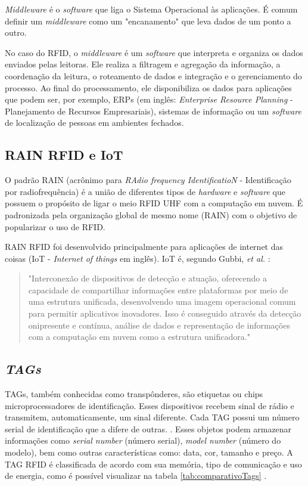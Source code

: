 \textit{Middleware} é o \textit{software} que liga o Sistema Operacional às aplicações. É comum definir um \textit{middleware} como um "encanamento" que leva dados de um ponto a outro. \cite{Middleware}

No caso do RFID, o \textit{middleware} é um \textit{software} que interpreta e organiza os dados enviados pelas leitoras. Ele realiza a filtragem e agregação da informação, a coordenação da leitura, o roteamento de dados e integração e o gerenciamento do processo. Ao final do processamento, ele disponibiliza os dados para aplicações que podem ser, por exemplo, ERPs (em inglês: \textit{Enterprise Resource Planning} - Planejamento de Recursos Empresariais), sistemas de informação ou um \textit{software} de localização de pessoas em ambientes fechados.

\subsection{RAIN RFID e IoT}

O padrão RAIN (acrônimo para \textit{RAdio frequency IdentificatioN} - Identificação por radiofrequência) é a união de diferentes tipos de \textit{hardware} e \textit{software} que possuem o propósito de ligar o meio RFID UHF com a computação em nuvem. É padronizada pela organização global de mesmo nome (RAIN) com o objetivo de popularizar o uso de RFID. \cite{RAIN}

RAIN RFID foi desenvolvido principalmente para aplicações de internet das coisas (IoT - \textit{Internet of things} em inglês). IoT é, segundo Gubbi, \textit{et al.} \cite{gubbi2013internet}:


\begin{quote}  
    "Interconexão de dispositivos de detecção e atuação, oferecendo a capacidade de compartilhar informações entre plataformas por meio de uma estrutura unificada, desenvolvendo uma imagem operacional comum para permitir aplicativos inovadores. Isso é conseguido através da detecção onipresente e contínua, análise de dados e representação de informações com a computação em nuvem como a estrutura unificadora." \cite{gubbi2013internet}
\end{quote}


\subsection{\textit{TAGs}}
TAGs, também conhecidas como transpônderes, são etiquetas ou chips microprocessadores de identificação. Esses dispositivos recebem sinal de rádio e transmitem, automaticamente, um sinal diferente. Cada TAG possui um número serial de identificação que a difere de outras. \cite{chawla2007overview}. Esses objetos podem armazenar informações como \textit{serial number} (número serial), \textit{model number} (número do modelo), bem como outras características como: data, cor, tamanho e preço. A TAG RFID é classificada de acordo com sua memória, tipo de comunicação e uso de energia, como é possível visualizar na tabela \ref{tab:comparativoTags}  \cite{AhmedIntegrationStreamMapping}.

